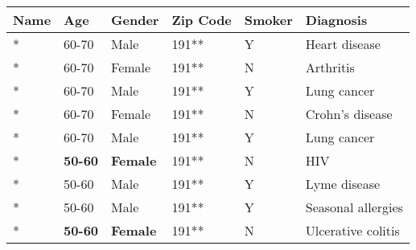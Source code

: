 \begin{tabular}{llllll}
\toprule
    \textbf{Name} & \textbf{Age} & \textbf{Gender} & \textbf{Zip Code} & \textbf{Smoker} & \textbf{Diagnosis} \\ \midrule
    * & 60-70 & Male & 191** & Y & Heart disease \\ 
    * & 60-70 & Female & 191** & N & Arthritis \\ 
    * & 60-70 & Male & 191** & Y & Lung cancer \\ 
    * & 60-70 & Female & 191** & N & Crohn's disease \\ 
    * & 60-70 & Male & 191** & Y & Lung cancer \\ 
    * & \textbf{50-60} & \textbf{Female} & 191** & N & HIV \\ 
    * & 50-60 & Male & 191** & Y & Lyme disease \\ 
    * & 50-60 & Male & 191** & Y & Seasonal allergies \\ 
    * & \textbf{50-60} & \textbf{Female} & 191** & N & Ulcerative colitis \\ \bottomrule
\end{tabular}

